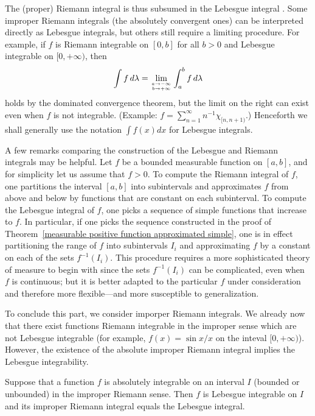 The (proper) Riemann integral is thus subsumed in the Lebesgue integral . Some improper Riemann integrals (the absolutely convergent ones) can be interpreted directly as Lebesgue integrals, but others still require a limiting procedure. For example, if $f$ is Riemann integrable on $[0,b]$ for all $b>0$ and Lebesgue integrable on $[0,+\infty)$, then 
\[\int f\,d\lambda=\lim_{a\to-\infty\atop b\to+\infty}\int_a^b f\,d\lambda\] holds by the dominated convergence theorem, but the limit on the right can exist even when $f$ is not integrable. (Example: $f=\sum_{n=1}^{\infty}n^{-1}\chi_{[n,n+1)}$.) Henceforth we shall generally use the notation $\int f(x)dx$ for Lebesgue integrals.\par
A few remarks comparing the construction of the Lebesgue and Riemann integrals may be helpful. Let $f$ be a bounded measurable function on $[a, b]$, and for simplicity let us assume that $f>0$. To compute the Riemann integral of $f$, one partitions the interval $[a,b]$ into subintervals and approximates $f$ from above and below by functions that are constant on each subinterval. To compute the Lebesgue integral of $f$, one picks a sequence of simple functions that increase to $f$. In particular, if one
picks the sequence constructed in the proof of Theorem~\ref{measurable positive function approximated simple}, one is in effect partitioning the range of $f$ into subintervals $I_i$ and approximating $f$ by a constant on each of the sets $f^{-1}(I_i)$. This procedure requires a more sophisticated theory of measure to begin with since the sets $f^{-1}(I_i)$ can be complicated, even when $f$ is continuous; but it is better adapted to the particular $f$ under consideration and therefore more flexible---and more susceptible to generalization.\par
To conclude this part, we consider imporper Riemann integrals. We already now that there exist functions Riemann integrable in the improper sense which are not Lebesgue integrable (for example, $f(x)=\sin x/x$ on the inteval $[0,+\infty)$). However, the existence of the absolute improper Riemann integral implies the Lebesgue integrability.
\begin{theorem}
Suppose that a function $f$ is absolutely integrable on an interval $I$ (bounded or unbounded) in the improper Riemann sense. Then $f$ is Lebesgue integrable on $I$ and its improper Riemann integral equals the Lebesgue integral.
\end{theorem}
